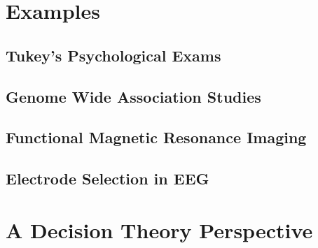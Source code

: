 \documentclass[11pt]{amsart}
\begin{document}
\section{\label{sec:examples}Examples}

\subsection{Tukey's Psychological Exams}

\subsection{Genome Wide Association Studies}

\subsection{Functional Magnetic Resonance Imaging}

\subsection{Electrode Selection in EEG}

\section{A Decision Theory Perspective}
\end{document}
